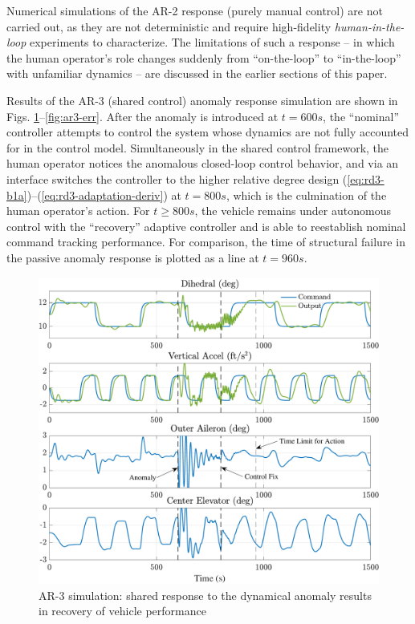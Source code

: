 \documentclass[english]{ifacconf}
\begin{document}
Numerical simulations of the AR-2 response (purely manual control) are not carried out, as they are not deterministic and require high-fidelity \textit{human-in-the-loop} experiments to characterize. The limitations of such a response -- in which the human operator's role changes suddenly from ``on-the-loop'' to ``in-the-loop'' with unfamiliar dynamics -- are discussed in the earlier sections of this paper.

Results of the AR-3 (shared control) anomaly response simulation are shown in Figs. \ref{fig:ar3-sim}--\ref{fig:ar3-err}. After the anomaly is introduced at $t = 600 s$, the ``nominal'' controller attempts to control the system whose dynamics are not fully accounted for in the control model. Simultaneously in the shared control framework, the human operator notices the anomalous closed-loop control behavior, and via an interface switches the controller to the higher relative degree design (\ref{eq:rd3-b1a})--(\ref{eq:rd3-adaptation-deriv}) at $t = 800 s$, which is the culmination of the human operator's action. For $t \geq 800 s$, the vehicle remains under autonomous control with the ``recovery'' adaptive controller and is able to reestablish nominal command tracking performance. For comparison, the time of structural failure in the passive anomaly response is plotted as a line at $t = 960 s$.

\begin{figure}[htbp]
	\centering
	\includegraphics[width=\columnwidth]{../fig/ar3.pdf}
	\caption{AR-3 simulation: shared response to the dynamical anomaly results in recovery of vehicle performance}
	\label{fig:ar3-sim}
\end{figure}
\end{document}
